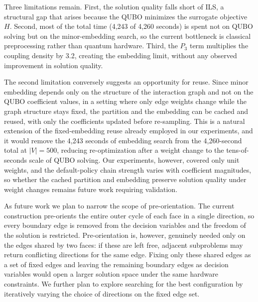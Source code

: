 \documentclass[twocolumn,a4paper]{article}
\begin{document}
Three limitations remain. First, the solution quality falls short of ILS, a structural gap that arises because the QUBO minimizes the surrogate objective \(H\). Second, most of the total time (4{,}243 of 4{,}260 seconds) is spent not on QUBO solving but on the minor-embedding search, so the current bottleneck is classical preprocessing rather than quantum hardware. Third, the \(P_3\) term multiplies the coupling density by 3.2, creating the embedding limit, without any observed improvement in solution quality.

The second limitation conversely suggests an opportunity for reuse. Since minor embedding depends only on the structure of the interaction graph and not on the QUBO coefficient values, in a setting where only edge weights change while the graph structure stays fixed, the partition and the embedding can be cached and reused, with only the coefficients updated before re-sampling. This is a natural extension of the fixed-embedding reuse already employed in our experiments, and it would remove the 4{,}243 seconds of embedding search from the 4{,}260-second total at \(|V|=500\), reducing re-optimization after a weight change to the tens-of-seconds scale of QUBO solving. Our experiments, however, covered only unit weights, and the default-policy chain strength varies with coefficient magnitudes, so whether the cached partition and embedding preserve solution quality under weight changes remains future work requiring validation.

As future work we plan to narrow the scope of pre-orientation. The current construction pre-orients the entire outer cycle of each face in a single direction, so every boundary edge is removed from the decision variables and the freedom of the solution is restricted. Pre-orientation is, however, genuinely needed only on the edges shared by two faces: if these are left free, adjacent subproblems may return conflicting directions for the same edge. Fixing only these shared edges as a set of fixed edges and leaving the remaining boundary edges as decision variables would open a larger solution space under the same hardware constraints. We further plan to explore searching for the best configuration by iteratively varying the choice of directions on the fixed edge set.



\end{document}
